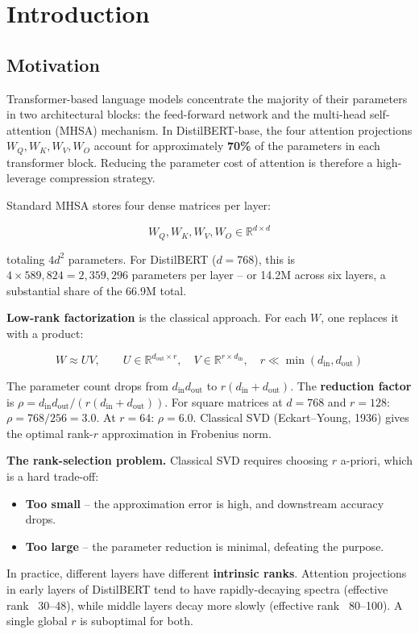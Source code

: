
\section{Introduction}

\subsection{Motivation}

Transformer-based language models concentrate the majority of their parameters 
in two architectural blocks: the feed-forward network and the multi-head 
self-attention (MHSA) mechanism. In DistilBERT-base, the four attention 
projections $W_Q, W_K, W_V, W_O$ account for approximately \textbf{70\%} of the 
parameters in each transformer block. Reducing the parameter cost of attention 
is therefore a high-leverage compression strategy.

Standard MHSA stores four dense matrices per layer:

\[
W_Q, W_K, W_V, W_O \in \mathbb{R}^{d \times d}
\tag{1.1}
\]

totaling $4d^2$ parameters. For DistilBERT ($d = 768$), this is $4 \times 589{,}824 = 2{,}359{,}296$ 
parameters per layer -- or 14.2M across six layers, a substantial share of the 
66.9M total.

\textbf{Low-rank factorization} is the classical approach. For each $W$, one 
replaces it with a product:

\[
W \approx U V, \qquad
U \in \mathbb{R}^{d_\text{out} \times r}, \quad
V \in \mathbb{R}^{r \times d_\text{in}}, \quad r \ll \min(d_\text{in}, d_\text{out})
\tag{1.2}
\]

The parameter count drops from $d_\text{in} d_\text{out}$ to 
$r(d_\text{in} + d_\text{out})$. The \textbf{reduction factor} is 
$\rho = d_\text{in} d_\text{out} / (r(d_\text{in} + d_\text{out}))$. For square 
matrices at $d = 768$ and $r = 128$: $\rho = 768 / 256 = 3.0$. At $r = 64$: 
$\rho = 6.0$. Classical SVD (Eckart--Young, 1936) gives the optimal rank-$r$ 
approximation in Frobenius norm.

\textbf{The rank-selection problem.} Classical SVD requires choosing $r$ 
a-priori, which is a hard trade-off:

\begin{itemize}
\item \textbf{Too small} -- the approximation error is high, and downstream accuracy
  drops.
\item \textbf{Too large} -- the parameter reduction is minimal, defeating the purpose.

\end{itemize}
In practice, different layers have different \textbf{intrinsic ranks}. Attention 
projections in early layers of DistilBERT tend to have rapidly-decaying 
spectra (effective rank ~30--48), while middle layers decay more slowly 
(effective rank ~80--100). A single global $r$ is suboptimal for both.

